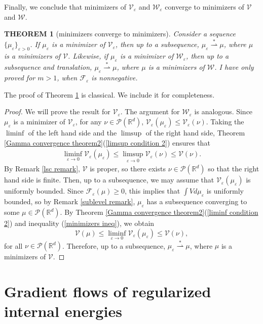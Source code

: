 \documentclass[11pt,leqno]{amsart}
\newtheorem{thm}{THEOREM}[section]
\theoremstyle{definition}
\newcommand{\Rd}{{\mathord{\mathbb R}^d}}
\newcommand{\wsto}{\stackrel{*}{\rightharpoonup}}
\newcommand{\F}{\mathcal{F}}
\def\P{{\mathcal P}}
\def\e{\varepsilon}
\def\F{\mathcal{F}}
\begin{document}
Finally, we conclude that minimizers of $\mathcal{V}_\e$ and $\mathcal{W}_\e$ converge to minimizers of $\mathcal{V}$ and $\mathcal{W}$.

\begin{thm}[minimizers converge to minimizers] \label{minimizers converge theorem}
Consider a sequence $\{ \mu_\e\}_{\e >0}$. If $ \mu_\e$ is a minimizer of $\mathcal{V}_\e$, then up to a subsequence, $\mu_\e \wsto \mu$, where $\mu$ is a minimizers of $\mathcal{V}$. Likewise, if $\mu_\e$ is a minimizer of $\mathcal{W}_\e$, then up to a subsequence and translation, $\mu_\e \wsto \mu$, where $\mu$ is a minimizers of $\mathcal{W}$. {\color{Aquamarine}  {I have only proved for $m>1$, when $\F_\e$ is nonnegative.}}
\end{thm}
 
 The proof of Theorem \ref{minimizers converge theorem} is classical. We include it for completeness.

\begin{proof}
We will prove the result for $\mathcal{V}_\e$. The argument for $\mathcal{W}_\e$ is analogous. Since $\mu_\e$ is a minimizer of $\mathcal{V}_\e$, for any $\nu \in \P(\Rd)$, $\mathcal{V}_\e(\mu_\e) \leq \mathcal{V}_\e(\nu)$. Taking the $\liminf$ of the left hand side and the $\limsup$ of the right hand side, Theorem \ref{Gamma convergence theorem2}(\ref{limsup condition 2}) ensures that 
\begin{align} \label{minimizers ineq}
 \liminf_{\e \to 0} \mathcal{V}_\e(\mu_\e) \leq \limsup_{\e \to 0} \mathcal{V}_\e(\nu) \leq \mathcal{V}(\nu) . 
 \end{align}
By Remark \ref{lsc remark}, $\mathcal{V}$ is proper, so there exists $\nu \in \P(\Rd)$ so that the right hand side is finite. Then, up to a subsequence, we may assume that $ \mathcal{V}_\e(\mu_\e)$ is uniformly bounded. Since $\F_\e(\mu) \geq 0$, this implies that $\int V d \mu_\e$ is uniformly bounded, so by Remark \ref{sublevel remark}, $\mu_\e$ has a subsequence converging to some $\mu \in \P(\Rd)$. By Theorem \ref{Gamma convergence theorem2}(\ref{liminf condition 2}) and inequality (\ref{minimizers ineq}), we obtain
\[ \mathcal{V}(\mu) \leq  \liminf_{\e \to 0} \mathcal{V}_\e(\mu_\e) \leq \mathcal{V}(\nu) ,
\]
for all $\nu \in \P(\Rd)$. Therefore, up to a subsequence, $\mu_\e \wsto \mu$, where $\mu$ is a minimizers of $\mathcal{V}$.
\end{proof}


\section{Gradient flows of regularized internal energies} \label{sec:gfs-reg-internal-energies}
\end{document}
